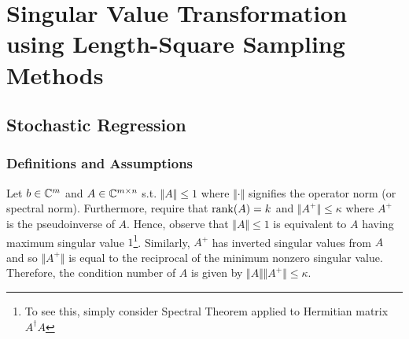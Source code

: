 \documentclass[main.tex]{subfiles}
\begin{document}
%
%

\section{Singular Value Transformation using Length-Square Sampling Methods}

\subsection{Stochastic Regression}

\subsubsection{Definitions and Assumptions}

Let $b \in \mathbb{C}^m$ and $A \in \mathbb{C}^{m \times n}$ s.t. $\Vert A \Vert \leq 1$ where $\Vert \cdot \Vert$ signifies the operator norm (or spectral norm). Furthermore, require that $\rank(A) = k$ and $\Vert A^+ \Vert \leq \kappa$ where $A^+$ is the pseudoinverse of $A$. Hence, observe that $\Vert A \Vert \leq 1$ is equivalent to $A$ having maximum singular value $1$\footnote{To see this, simply consider Spectral Theorem applied to Hermitian matrix $A^\dag A$}. Similarly, $A^+$ has inverted singular values from $A$ and so $\Vert A^+ \Vert$ is equal to the reciprocal of the minimum nonzero singular value. Therefore, the condition number of $A$ is given by $\Vert A \Vert \Vert A^+ \Vert \leq \kappa$.
\end{document}
